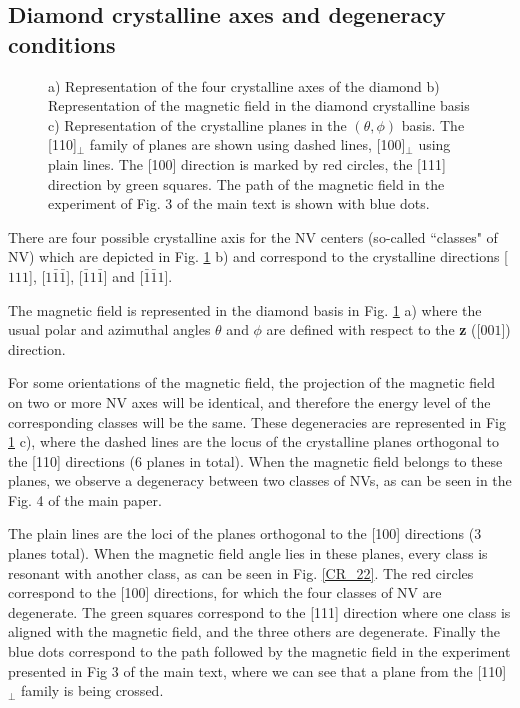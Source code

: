 \documentclass[preprintnumbers,amsmath,amssymb,onecolumn,12pt]{revtex4}
\begin{document}
\subsection{Diamond crystalline axes and degeneracy conditions}
\begin{figure}[!ht]
  \centering {}
  \caption{a) Representation of the four crystalline axes of the diamond b) Representation of the magnetic field in the diamond crystalline basis c) Representation of the crystalline planes in the $(\theta , \phi)$ basis. The [110]$_\perp$ family of planes are shown using dashed lines, [100]$_\perp$ using plain lines. The [100] direction is marked by red circles, the [111] direction by green squares. The path of the magnetic field in the experiment of Fig. 3 of the main text is shown with blue dots.}
	\label{cristallo}
\end{figure}
There are four possible crystalline axis for the NV centers (so-called ``classes" of NV) which are depicted in Fig. \ref{cristallo} b) and correspond to the crystalline directions [$111$], [$1\bar 1 \bar 1$], [$\bar 1 1 \bar 1$] and [$\bar 1 \bar 1 1$]. 

The magnetic field is represented in the diamond basis in Fig. \ref{cristallo} a) where the usual polar and azimuthal angles $\theta$ and $\phi$ are defined with respect to the \textbf{z} ([$001$]) direction.

For some orientations of the magnetic field, the projection of the magnetic field on two or more NV axes will be identical, and therefore the energy level of the corresponding classes will be the same. These degeneracies are represented in Fig \ref{cristallo} c), where the dashed lines are the locus of the crystalline planes orthogonal to the [110] directions (6 planes in total). When the magnetic field belongs to these planes, we observe a degeneracy between two classes of NVs, as can be seen in the Fig. 4 of the main paper.

The plain lines are the loci of the planes orthogonal to the [100] directions (3 planes total). When the magnetic field angle lies in these planes, every class is resonant with another class, as can be seen in Fig. \ref{CR_22}.
The red circles correspond to the [100] directions, for which the four classes of NV are degenerate. The green squares correspond to the [111] direction where one class is aligned with the magnetic field, and the three others are degenerate. Finally the blue dots correspond to the path followed by the magnetic field in the experiment presented in Fig 3 of the main text, where we can see that a plane from the [110]$_\perp$ family is being crossed.
\end{document}
